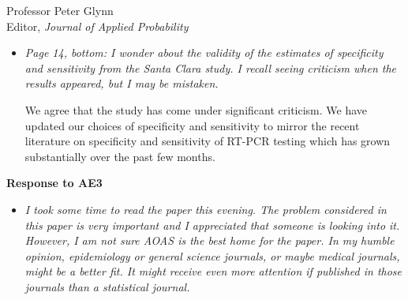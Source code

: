 \documentclass[11pt]{letter} %
\begin{document}
\begin{letter}{Professor
	Peter Glynn\\
	Editor, {\em Journal of Applied Probability}}
\begin{enumerate}
\begin{itemize}
\item {\it Page 14, bottom: I wonder about the validity of the estimates of specificity and sensitivity from the Santa Clara study. I recall seeing criticism when the results appeared, but I may be mistaken.}

\vspace{5mm}
We agree that the study has come under significant criticism.  We have updated our choices of specificity and sensitivity to mirror the recent literature on specificity and sensitivity of RT-PCR testing which has grown substantially over the past few months.
\vspace{5mm}
\end{itemize}

\end{enumerate}
\newpage

{\bf Response to AE3}
\begin{itemize}
\item {\it I took some time to read the paper this evening.  The problem considered in this paper is very important and I appreciated that someone is looking into it.  However, I am not sure AOAS is the best home for the paper.  In my humble opinion, epidemiology or general science journals, or maybe medical journals, might be a better fit.  It might receive even more attention if published in those journals than a statistical journal.}


\end{itemize}
\end{letter}
\end{document}

